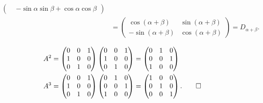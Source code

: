 \begin{loesung}
\begin{teilaufgaben}
\begin{align*}
\begin{pmatrix}
	&-\sin\alpha\sin\beta+\cos\alpha\cos\beta
\end{pmatrix}
\\
&=
\begin{pmatrix}
 \cos(\alpha+\beta)&\sin(\alpha+\beta)\\
-\sin(\alpha+\beta)&\cos(\alpha+\beta)
\end{pmatrix}=D_{\alpha+\beta}.
\end{align*}
\item
\begin{align*}
A^2
&=
\begin{pmatrix}0&0&1\\1&0&0\\0&1&0\end{pmatrix}
\begin{pmatrix}0&0&1\\1&0&0\\0&1&0\end{pmatrix}
=
\begin{pmatrix} 0&1&0\\ 0&0&1\\ 1&0&0\end{pmatrix}
\\
A^3&=
\begin{pmatrix}0&0&1\\1&0&0\\0&1&0\end{pmatrix}
\begin{pmatrix} 0&1&0\\ 0&0&1\\ 1&0&0\end{pmatrix}
=
\begin{pmatrix}
1&0&0\\0&1&0\\0&0&1
\end{pmatrix}.
\qedhere
\end{align*}
\end{teilaufgaben}
\end{loesung}
